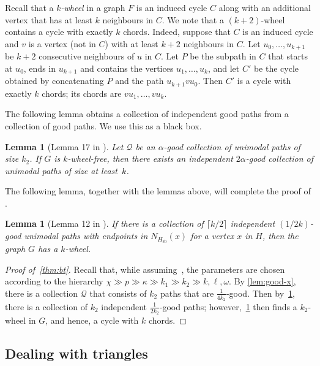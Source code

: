\documentclass[11pt,english]{article}
\theoremstyle{plain}
\newtheorem{lem}[thm]{Lemma}
\theoremstyle{definition}
\theoremstyle{remark}
\newcommand{\ceil}[1]{
    \lceil #1 \rceil
}
\newcommand{\Q}{\mathcal{Q}}
\newcommand{\sbb}{\mathrm{sb}}
\begin{document}
	Recall that a \emph{$k$-wheel} in a graph $F$ is an induced cycle $C$ along with an additional vertex that has at least $k$ neighbours in $C$. We note that a $(k+2)$-wheel contains a cycle with exactly $k$ chords. Indeed, suppose that $C$ is an induced cycle and $v$ is a vertex (not in $C$) with at least $k+2$ neighbours in $C$. Let $u_0, \ldots, u_{k+1}$ be $k+2$ consecutive neighbours of $u$ in $C$. Let $P$ be the subpath in $C$ that starts at $u_0$, ends in $u_{k+1}$ and contains the vertices $u_1, \ldots, u_k$, and let $C'$ be the cycle obtained by concatenating $P$ and the path $u_{k+1} v u_0$. Then $C'$ is a cycle with exactly $k$ chords; its chords are $vu_1, \ldots, vu_k$. 
	
	The following lemma obtains a collection of independent good paths from a collection of good paths. We use this as a black box.
	\begin{lem}[Lemma 17 in \cite{bousquet-thomasse}] \label{lem:make-Q-independent}
        Let $\Q$ be an $\alpha$-good collection of unimodal paths of size $k_2$.
        If $G$ is $k$-wheel-free, then
        there exists an independent $2\alpha$-good collection of unimodal paths of size at least~$k$.
	\end{lem}
	
	The following lemma, together with the lemmas above, will complete the proof of .
	
	\begin{lem}[Lemma 12 in \cite{bousquet-thomasse}] \label{lem:find-k-wheel}
		If there is a collection of $\ceil{k/2}$ independent $(1/2k)$-good unimodal paths with endpoints in $N_{H_\sbb}(x)$ for a vertex $x$ in $H$, then the graph $G$ has a $k$-wheel.
	\end{lem}
	\begin{proof}[Proof of~\cref{thm:bt}]
	 Recall that, while assuming~,  the parameters are chosen according to the hierarchy $\chi \gg p \gg \kappa \gg k_1 \gg k_2 \gg k, \ell, \omega$.
	 By \cref{lem:good-x}, there is a collection $\Q$ that consists of $k_2$ paths that are $\frac{1}{4k_2}$-good.
	 Then by~\cref{lem:make-Q-independent}, there is a collection of $k_2$ independent $\frac{1}{2k_2}$-good paths; however,~\cref{lem:find-k-wheel} then finds a $k_2$-wheel in $G$, and hence, a cycle with $k$ chords.
	\end{proof}

    \subsection{Dealing with triangles} \label{subsec:triangles}
    
\end{document}
